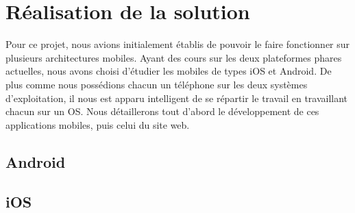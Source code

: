 \cleardoublepage



\chapter{Réalisation de la solution}

Pour ce projet, nous avions initialement établis de pouvoir le faire fonctionner sur plusieurs architectures mobiles.
Ayant des cours sur les deux plateformes phares actuelles, nous avons choisi
d'étudier les mobiles de types iOS et Android.
De plus comme nous possédions chacun un téléphone sur les deux systèmes d'exploitation, il nous est apparu intelligent de se répartir le travail en travaillant chacun sur un OS.
Nous détaillerons tout d'abord le développement de ces applications mobiles, puis celui du site web.
\\






\section{Android}








\section{iOS}

